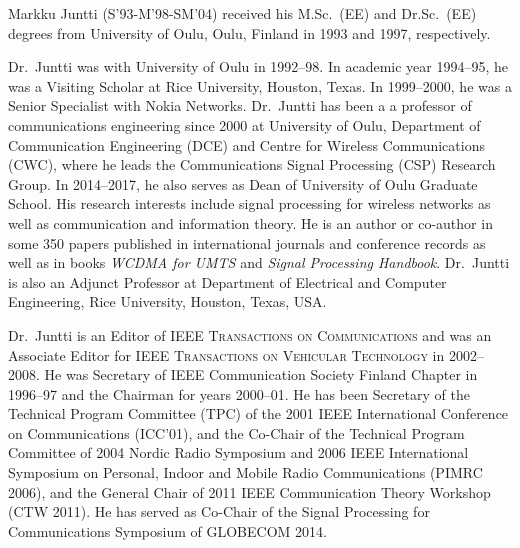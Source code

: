 \begin{IEEEbiography}{Markku Juntti}
(S'93-M'98-SM'04) received his M.Sc.\ (EE) and Dr.Sc.\ (EE) degrees from University of Oulu, Oulu, Finland in 1993 and 1997, respectively.
	
Dr.\ Juntti was with University of Oulu in 1992--98. In academic year 1994--95, he was a Visiting Scholar at Rice University, Houston, Texas. In 1999--2000, he was a Senior Specialist with Nokia Networks. Dr.\ Juntti has been a a professor of communications engineering since 2000 at University of Oulu, Department of Communication Engineering (DCE) and Centre for Wireless Communications (CWC), where he leads the Communications Signal Processing (CSP) Research Group. In 2014--2017, he also serves as Dean of University of Oulu Graduate School. His research interests include signal processing for wireless networks as well as communication and information theory. He is an author or co-author in some 350 papers published in international journals and conference records as well as in books {\it WCDMA for UMTS} and {\it Signal Processing Handbook}. Dr.\ Juntti is also an Adjunct Professor at Department of Electrical and Computer Engineering, Rice University, Houston, Texas, USA.
	
Dr.\ Juntti is an Editor of \textsc{IEEE Transactions on Communications} and was an Associate Editor for \textsc{IEEE Transactions on Vehicular Technology} in 2002--2008. He was Secretary of IEEE Communication Society Finland Chapter in 1996--97 and the Chairman for years 2000--01. He has been Secretary of the Technical Program Committee (TPC) of the 2001 IEEE International Conference on Communications (ICC'01), and the Co-Chair of the Technical Program Committee of 2004 Nordic Radio Symposium and 2006 IEEE International Symposium on Personal, Indoor and Mobile Radio Communications (PIMRC 2006), and the General Chair of 2011 IEEE Communication Theory Workshop (CTW 2011). He has served as Co-Chair of the Signal Processing for Communications Symposium of GLOBECOM 2014.
\end{IEEEbiography}

